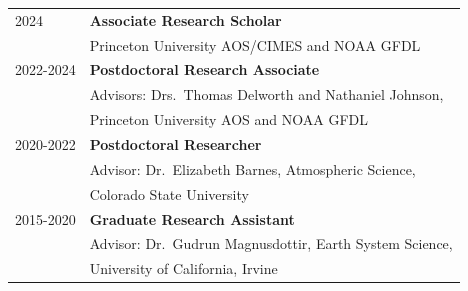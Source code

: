 \documentclass[margin,line,palatino,courier,10pt]{res}
\begin{document}
\begin{resume}
\begin{tabular}{@{}p{0.9in}p{4in}}
2024 & \textbf{Associate Research Scholar}\\
& \hspace{0.2in} Princeton University AOS/CIMES and NOAA GFDL\\

2022-2024 & \textbf{Postdoctoral Research Associate}\\
& \hspace{0.2in} Advisors: Drs.\ Thomas Delworth and Nathaniel Johnson,\\
& \vspace{-0.18in}\hspace{0.2in} Princeton University AOS and NOAA GFDL\\

2020-2022 & \textbf{Postdoctoral Researcher}\\
& \hspace{0.2in} Advisor: Dr.\ Elizabeth Barnes, Atmospheric Science,\\
& \vspace{-0.18in}\hspace{0.2in} Colorado State University\\

2015-2020 & \textbf{Graduate Research Assistant}\\
& \hspace{0.2in} Advisor: Dr.\ Gudrun Magnusdottir, Earth System Science,\\
& \vspace{-0.18in}\hspace{0.2in} University of California, Irvine\\



\end{tabular}
\end{resume}
\end{document}

